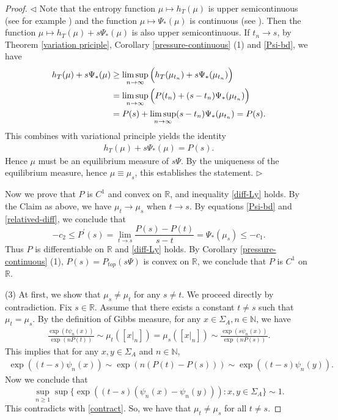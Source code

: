 \documentclass[reqno,11pt,graphicx,]{amsart}
\numberwithin{equation}{section}
\theoremstyle{plain}
\newcommand{\N}{{\mathbb N}}
\newcommand{\R}{{\mathbb R}}
\newcommand{\3}{\mathbf{3}}
\begin{document}
\begin{proof}
		\noindent $\lhd $	Note that the entropy function $\mu\mapsto h_{T}(\mu)$ is upper semicontinuous (see for example \cite{Wa1982}) and the function $\mu\mapsto\Psi_*(\mu)$ is continuous (see \cite[equation (36)]{Ba2006}). Then the function 
		$
		\mu\mapsto h_{T}(\mu)+s\Psi_*(\mu)
		$
		is also upper semicontinuous. If $t_n\to s$, by Theorem \ref{variation priciple}, Corollary \ref{pressure-continuous} (1) and \eqref{Psi-bd}, we have 
		\begin{align*}
			h_{T}(\mu)+s\Psi_*(\mu)&\geq\limsup_{n\to\infty}\Big(h_T(\mu_{t_n})+s
			\Psi_*(\mu_{t_n})\Big)\notag \\
			&=\limsup_{n\to\infty}\Big(P(t_n)+(s-t_n)\Psi_*(\mu_{t_n})\Big)\notag\\
			&=P(s)+\limsup_{n\to\infty}(s-t_n)\Psi_*(\mu_{t_n})=P(s).
		\end{align*}
		This combines with variational principle yields the identity 
		\begin{align*}
			h_{T}(\mu)+s\Psi_*(\mu)=P(s).
		\end{align*}
		Hence $\mu$ must be an equilibrium measure of $s\Psi$. By the uniqueness of the equilibrium measure, hence $\mu\equiv\mu_s$, this establishes the statement.
		\hfill $\rhd$
		
		Now we prove that $P$ is $C^1$ and convex on $\R$, and inequality \eqref{diff-Ly} holds. By the Claim as above, we have $\mu_{t}\to\mu_s$ when $t\to s$. By equations \eqref{Psi-bd} and \eqref{relatived-diff}, we conclude that 
		\begin{equation*}
			-c_2\leq P^{\prime }(s)=\lim_{t\to s}\frac{P(s)-P(t)}{s-t}=\Psi_*(\mu_s)\leq-c_1. \label{qpr}
		\end{equation*}
		Thus $P$ is differentiable on ${\mathbb{R}}$ and \eqref{diff-Ly} holds. By Corollary \ref{pressure-continuous} (1), $P(s)=P_{top}(s\Psi)$ is convex on ${\mathbb{R}}$, we conclude that $P$ is $C^1$ on ${\mathbb{R}}$.
		
		(3) At first, we show that $\mu_{s}\neq\mu_{t}$ for any $s\neq t$. We proceed directly by contradiction. Fix $s\in\R$. Assume that there exists a constant $t\neq s$ such that $\mu_{t}=\mu_{s}$. By the definition of Gibbs measure, for any $x\in\Sigma_{A},n\in\N$, we have
		\begin{align*}
			\frac{\exp(t\psi_{n}(x))}{\exp(nP(t))}\sim\mu_{t}([x|_n])=\mu_{s}([x|_n])\sim\frac{\exp(s\psi_{n}(x))}{\exp(nP(s))}.
		\end{align*}
		This implies that for any $x,y\in\Sigma_{A}$ and $n\in\N$,
		\begin{align*}
			\exp((t-s)\psi_{n}(x))\sim\exp(n(P(t)-P(s)))\sim\exp((t-s)\psi_{n}(y)).
		\end{align*}	
		Now we conclude that 
		\begin{equation*}
			\sup_{n\geq1}\sup\{\exp((t-s)(\psi_{n}(x)-\psi_{n}(y))):x,y\in\Sigma_{A}\}\sim1.
		\end{equation*}
		This contradicts with \eqref{contract}. So, we have that $\mu_{t}\neq\mu_{s}$ for all $t\neq s$.
		

\end{proof}
\end{document}
